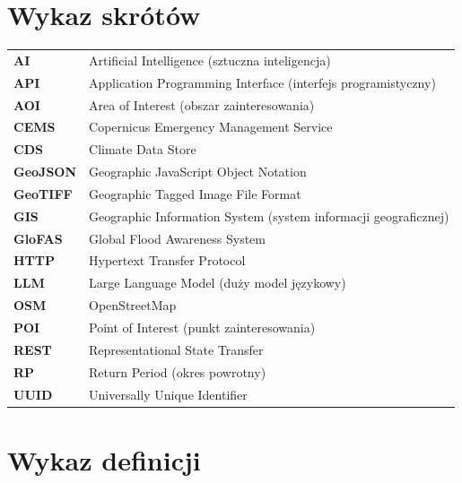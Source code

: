 \section*{Wykaz skrótów}

\begin{tabular}{ll}
\textbf{AI} & Artificial Intelligence (sztuczna inteligencja) \\
\textbf{API} & Application Programming Interface (interfejs programistyczny) \\
\textbf{AOI} & Area of Interest (obszar zainteresowania) \\
\textbf{CEMS} & Copernicus Emergency Management Service \\
\textbf{CDS} & Climate Data Store \\
\textbf{GeoJSON} & Geographic JavaScript Object Notation \\
\textbf{GeoTIFF} & Geographic Tagged Image File Format \\
\textbf{GIS} & Geographic Information System (system informacji geograficznej) \\
\textbf{GloFAS} & Global Flood Awareness System \\
\textbf{HTTP} & Hypertext Transfer Protocol \\
\textbf{LLM} & Large Language Model (duży model językowy) \\
\textbf{OSM} & OpenStreetMap \\
\textbf{POI} & Point of Interest (punkt zainteresowania) \\
\textbf{REST} & Representational State Transfer \\
\textbf{RP} & Return Period (okres powrotny) \\
\textbf{UUID} & Universally Unique Identifier \\
\end{tabular}

\newpage
\section*{Wykaz definicji}

